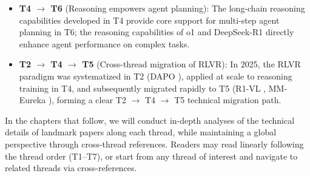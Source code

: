 \begin{itemize}[leftmargin=2em]
  \item \textbf{T4 $\rightarrow$ T6} (Reasoning empowers agent planning):
    The long-chain reasoning capabilities developed in T4 provide core support for multi-step agent planning in T6;
    the reasoning capabilities of o1 and DeepSeek-R1 directly enhance agent performance on complex tasks.

  \item \textbf{T2 $\rightarrow$ T4 $\rightarrow$ T5} (Cross-thread migration of RLVR):
    In 2025, the RLVR paradigm was systematized in T2 (DAPO \cite{yu2025dapo}),
    applied at scale to reasoning training in T4,
    and subsequently migrated rapidly to T5 (R1-VL \cite{zhang2025r1vl}, MM-Eureka \cite{meng2025mmeureka}),
    forming a clear T2 $\rightarrow$ T4 $\rightarrow$ T5 technical migration path.
\end{itemize}



\noindent
In the chapters that follow, we will conduct in-depth analyses of the technical details of landmark papers along each thread,
while maintaining a global perspective through cross-thread references. Readers may read linearly following the thread order (T1--T7),
or start from any thread of interest and navigate to related threads via cross-references.
